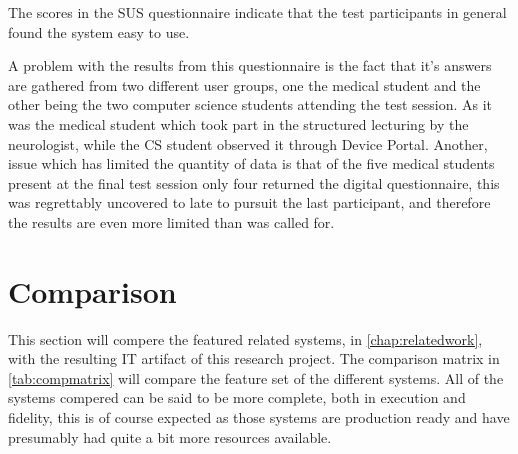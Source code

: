 The scores in the SUS questionnaire indicate that the test participants in general found the system easy to use. 

A problem with the results from this questionnaire is the fact that it's answers are gathered from two different user groups, one the medical student and the other being the two computer science students attending the test session. As it was the medical student which took part in the structured lecturing by the neurologist, while the CS student observed it through Device Portal. Another, issue which has limited the quantity of data is that of the five medical students present at the final test session only four returned the digital questionnaire, this was regrettably uncovered to late to pursuit the last participant, and therefore the results are even more limited than was called for.


\section{Comparison}
This section will compere the featured related systems, in \autoref{chap:relatedwork}, with the resulting IT artifact of this research project. The comparison matrix in \autoref{tab:compmatrix} will compare the feature set of the different systems. All of the systems compered can be said to be more complete, both in execution and fidelity, this is of course expected as those systems are production ready and have presumably had quite a bit more resources available.

